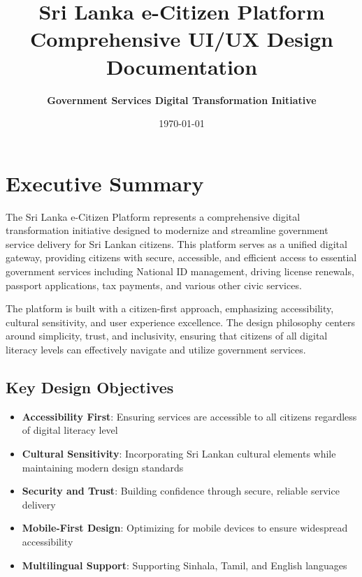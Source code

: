 \documentclass[12pt,a4paper]{article}
\begin{document}
\title{\Huge\textbf{\color{primary}Sri Lanka e-Citizen Platform}\\
\Large\color{muted}Comprehensive UI/UX Design Documentation}
\author{\textbf{Government Services Digital Transformation Initiative}}
\date{\today}

\maketitle

\newpage

\tableofcontents

\newpage

\section{Executive Summary}

The Sri Lanka e-Citizen Platform represents a comprehensive digital transformation initiative designed to modernize and streamline government service delivery for Sri Lankan citizens. This platform serves as a unified digital gateway, providing citizens with secure, accessible, and efficient access to essential government services including National ID management, driving license renewals, passport applications, tax payments, and various other civic services.

The platform is built with a citizen-first approach, emphasizing accessibility, cultural sensitivity, and user experience excellence. The design philosophy centers around simplicity, trust, and inclusivity, ensuring that citizens of all digital literacy levels can effectively navigate and utilize government services.

\subsection{Key Design Objectives}

\begin{itemize}
    \item \textbf{Accessibility First}: Ensuring services are accessible to all citizens regardless of digital literacy level
    \item \textbf{Cultural Sensitivity}: Incorporating Sri Lankan cultural elements while maintaining modern design standards
    \item \textbf{Security and Trust}: Building confidence through secure, reliable service delivery
    \item \textbf{Mobile-First Design}: Optimizing for mobile devices to ensure widespread accessibility
    \item \textbf{Multilingual Support}: Supporting Sinhala, Tamil, and English languages
\end{itemize}
\end{document}
